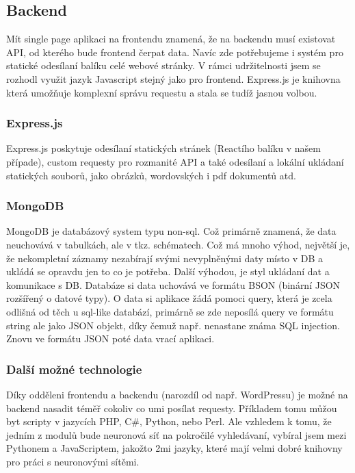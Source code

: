 \subsection{Backend}
Mít single page aplikaci na frontendu znamená, že na backendu musí existovat API,
od kterého bude frontend čerpat data.
Navíc zde potřebujeme i systém pro statické odesílaní balíku celé webové stránky.
V rámci udržitelnosti jsem se rozhodl využit jazyk Javascript stejný jako pro frontend.
Express.js je knihovna která umožňuje komplexní správu requestu a
stala se tudíž jasnou volbou.

\subsubsection{Express.js}
Express.js poskytuje odesílaní statických stránek (Reactího balíku v našem případe),
custom requesty pro rozmanité API a také odesílaní a lokální ukládaní statických souborů,
jako obrázků, wordovských i pdf dokumentů atd.

\subsubsection{MongoDB}
MongoDB je databázový system typu non-sql.
Což primárně znamená, že data neuchovává v tabulkách, ale v tkz. schématech.
Což má mnoho výhod, největší je, že nekompletní záznamy nezabírají
svými nevyplněnými daty místo v DB a ukládá se opravdu jen to co je potřeba.
Další výhodou, je styl ukládaní dat a komunikace s DB.
Databáze si data uchovává ve formátu BSON (binární JSON rozšířený o datové typy).
O data si aplikace žádá pomoci query,
která je zcela odlišná od těch u sql-like databází,
primárně se zde neposílá query ve formátu string ale jako JSON objekt,
díky čemuž např. nenastane známa SQL injection.
Znovu ve formátu JSON poté data vrací aplikaci.

\subsubsection{Další možné technologie}
Díky odděleni frontendu a backendu (narozdíl od např. WordPressu) je možné
na backend nasadit téměř cokoliv co umi posílat requesty.
Příkladem tomu můžou byt scripty v jazycích PHP, C\#, Python, nebo Perl.
Ale vzhledem k tomu, že jedním z modulů bude neuronová síť na pokročilé vyhledávaní,
vybíral jsem mezi Pythonem a JavaScriptem, jakožto 2mi jazyky, které
mají velmi dobré knihovny pro práci s neuronovými sítěmi.

